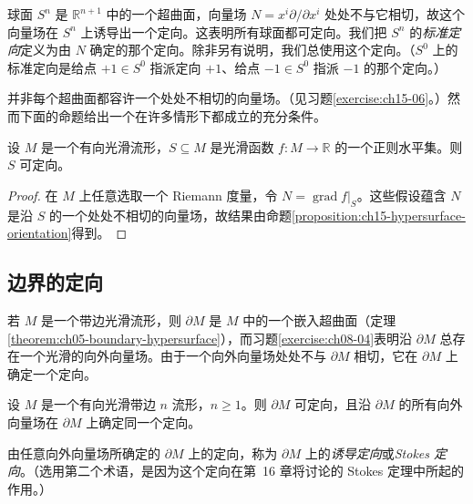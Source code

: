 \documentclass[../../main.tex]{subfiles}
\begin{document}
\begin{example}\label{example:ch15-sphere-orientation}
球面 $S^n$ 是 $\mathbb{R}^{n+1}$ 中的一个超曲面，向量场 $N=x^i\partial/\partial x^i$ 处处不与它相切，故这个向量场在 $S^n$ 上诱导出一个定向。这表明所有球面都可定向。我们把 $S^n$ 的\emph{标准定向}定义为由 $N$ 确定的那个定向。除非另有说明，我们总使用这个定向。（$S^0$ 上的标准定向是给点 $+1\in S^0$ 指派定向 $+1$、给点 $-1\in S^0$ 指派 $-1$ 的那个定向。）
\end{example}

并非每个超曲面都容许一个处处不相切的向量场。（见习题\ref{exercise:ch15-06}。）然而下面的命题给出一个在许多情形下都成立的充分条件。

\begin{proposition}\label{proposition:ch15-regular-level-orientable}
设 $M$ 是一个有向光滑流形，$S\subseteq M$ 是光滑函数 $f:M\to\mathbb{R}$ 的一个正则水平集。则 $S$ 可定向。
\end{proposition}

\begin{proof}
在 $M$ 上任意选取一个 Riemann 度量，令 $N=\operatorname{grad}f|_S$。这些假设蕴含 $N$ 是沿 $S$ 的一个处处不相切的向量场，故结果由命题\ref{proposition:ch15-hypersurface-orientation}得到。
\end{proof}

\subsection{边界的定向}

若 $M$ 是一个带边光滑流形，则 $\partial M$ 是 $M$ 中的一个嵌入超曲面（定理\ref{theorem:ch05-boundary-hypersurface}），而习题\ref{exercise:ch08-04}表明沿 $\partial M$ 总存在一个光滑的向外向量场。由于一个向外向量场处处不与 $\partial M$ 相切，它在 $\partial M$ 上确定一个定向。

\begin{proposition}[边界上的诱导定向]\label{proposition:ch15-boundary-orientation}
设 $M$ 是一个有向光滑带边 $n$ 流形，$n\geqslant1$。则 $\partial M$ 可定向，且沿 $\partial M$ 的所有向外向量场在 $\partial M$ 上确定同一个定向。
\end{proposition}

\begin{remark}
由任意向外向量场所确定的 $\partial M$ 上的定向，称为 $\partial M$ 上的\emph{诱导定向}或\emph{Stokes 定向}。（选用第二个术语，是因为这个定向在第~16 章将讨论的 Stokes 定理中所起的作用。）
\end{remark}
\end{document}
